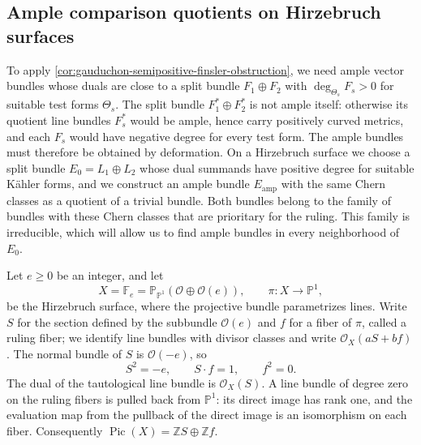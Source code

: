 \subsection{Ample comparison quotients on Hirzebruch surfaces}
\label{subsec:hirzebruch-ample-comparison}

To apply \cref{cor:gauduchon-semipositive-finsler-obstruction}, we need ample vector bundles whose duals are close to a split bundle $F_1\oplus F_2$ with $\deg_{\Theta_s}F_s>0$ for suitable test forms $\Theta_s$. The split bundle $F_1^*\oplus F_2^*$ is not ample itself: otherwise its quotient line bundles $F_s^*$ would be ample, hence carry positively curved metrics, and each $F_s$ would have negative degree for every test form. The ample bundles must therefore be obtained by deformation. On a Hirzebruch surface we choose a split bundle $E_0=L_1\oplus L_2$ whose dual summands have positive degree for suitable K\"ahler forms, and we construct an ample bundle $E_{\mathrm{amp}}$ with the same Chern classes as a quotient of a trivial bundle. Both bundles belong to the family of bundles with these Chern classes that are prioritary for the ruling. This family is irreducible, which will allow us to find ample bundles in every neighborhood of $E_0$.

Let $e\geq0$ be an integer, and let
\[
 X=\mathbb F_e=\mathbb P_{\mathbb P^1}(\mathcal O\oplus\mathcal O(e)),
 \qquad \pi\colon X\longrightarrow\mathbb P^1,
\]
be the Hirzebruch surface, where the projective bundle parametrizes lines. Write $S$ for the section defined by the subbundle $\mathcal O(e)$ and $f$ for a fiber of $\pi$, called a ruling fiber; we identify line bundles with divisor classes and write $\mathcal O_X(aS+bf)$. The normal bundle of $S$ is $\mathcal O(-e)$, so
\[
 S^2=-e,\qquad S\cdot f=1,\qquad f^2=0.
\]
The dual of the tautological line bundle is $\mathcal O_X(S)$. A line bundle of degree zero on the ruling fibers is pulled back from $\mathbb P^1$: its direct image has rank one, and the evaluation map from the pullback of the direct image is an isomorphism on each fiber. Consequently $\operatorname{Pic}(X)=\mathbb ZS\oplus\mathbb Zf$.

